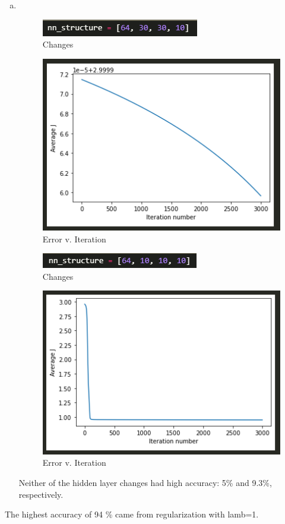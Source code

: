 \documentclass[12pt]{article}
\begin{document}
\begin{enumerate}[(a)]
	\item \,
		\begin{figure}[H]
			\centering
			\includegraphics[width=\textwidth/2]{images/7fchange.png}
			\caption{Changes}
			\label{fig:7:f:change}
		\end{figure}
		\begin{figure}[H]
			\centering
			\includegraphics[width=\textwidth/2]{images/7fgraph.png}
			\caption{Error v. Iteration}
			\label{fig:7:f:graph}
		\end{figure}
		\begin{figure}[H]
			\centering
			\includegraphics[width=\textwidth/2]{images/7fchange1.png}
			\caption{Changes}
			\label{fig:7:f:change}
		\end{figure}
		\begin{figure}[H]
			\centering
			\includegraphics[width=\textwidth/2]{images/7fgraph1.png}
			\caption{Error v. Iteration}
			\label{fig:7:f:graph}
		\end{figure}
		Neither of the hidden layer changes had high accuracy: 5\% and 9.3\%, respectively. 
	
\end{enumerate}
The highest accuracy of 94 \% came from regularization with lamb=1.
\end{document}
